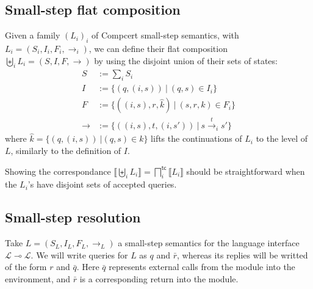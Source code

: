 \documentclass[11pt]{article}
\newcommand{\kw}[1]{{\mathsf{#1}}}
\begin{document}
\subsection{Small-step flat composition}

Given a family $(L_i)_i$ of Compcert small-step semantics,
with $L_i = (S_i, I_i, F_i, {\rightarrow_i})$,
we can define their flat composition $\biguplus_i L_i = (S, I, F, {\rightarrow})$
by using the disjoint union of their sets of states:
\begin{align*}
  S &:= \sum_i S_i \\
  I &:= \{ (q, (i, s)) \: \vert \: (q, s) \in I_i \} \\
  F &:= \{ ((i, s), r, \hat{k}) \: \vert \: (s, r, k) \in F_i \} \\
  {\rightarrow} &:= \{ ((i, s), t, (i, s')) \: \vert \: s
\stackrel{t}{\rightarrow}_i s' \}
\end{align*}
where $\hat{k} = \{ (q, (i, s)) \: \vert (q, s) \in k \}$
lifts the continuations of $L_i$ to the level of $L$,
similarly to the definition of $I$.

Showing the correspondance
$\llbracket \biguplus_i L_i \rrbracket =
 \bigsqcap_i^\kw{tc} \llbracket L_i \rrbracket$
should be straightforward
when the $L_i$'s have disjoint sets of accepted queries.

\subsection{Small-step resolution}

Take $L = (S_L, I_L, F_L, {\rightarrow_L})$ a small-step semantics
for the language interface $\mathcal{L} \multimap \mathcal{L}$.
We will write queries for $L$ as $q$ and $\bar{r}$,
whereas its replies will be writted of the form $r$ and $\bar{q}$.
Here $\bar{q}$ represents external calls from the module into the environment,
and $\bar{r}$ is a corresponding return into the module.
\end{document}

